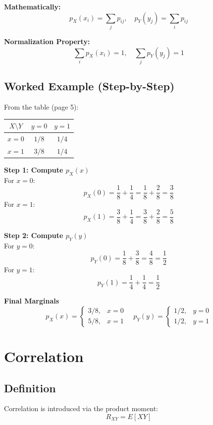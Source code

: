 \documentclass[12pt,a4paper]{article}
\begin{document}
\textbf{Mathematically:}
\[
p_X(x_i) = \sum_j p_{ij}, \quad p_Y(y_j) = \sum_i p_{ij}
\]

\textbf{Normalization Property:}
\[
\sum_i p_X(x_i)=1, \quad \sum_j p_Y(y_j)=1
\]

\subsection{Worked Example (Step-by-Step)}
From the table (page 5):

\begin{table}[h!]
\centering
\renewcommand{\arraystretch}{1.5}
\begin{tabular}{|c|c|c|}
\hline
$X \setminus Y$ & $y=0$ & $y=1$ \\
\hline
$x=0$ & $1/8$ & $1/4$ \\
\hline
$x=1$ & $3/8$ & $1/4$ \\
\hline
\end{tabular}
\end{table}

\textbf{Step 1: Compute $p_X(x)$} \\
For $x=0$:
\[
p_X(0) = \frac{1}{8} + \frac{1}{4} = \frac{1}{8} + \frac{2}{8} = \frac{3}{8}
\]
For $x=1$:
\[
p_X(1) = \frac{3}{8} + \frac{1}{4} = \frac{3}{8} + \frac{2}{8} = \frac{5}{8}
\]

\textbf{Step 2: Compute $p_Y(y)$} \\
For $y=0$:
\[
p_Y(0) = \frac{1}{8} + \frac{3}{8} = \frac{4}{8} = \frac{1}{2}
\]
For $y=1$:
\[
p_Y(1) = \frac{1}{4} + \frac{1}{4} = \frac{1}{2}
\]

\textbf{Final Marginals}
\[
p_X(x) =
\begin{cases} 
3/8, & x=0 \\ 
5/8, & x=1 
\end{cases}
\quad
p_Y(y) =
\begin{cases} 
1/2, & y=0 \\ 
1/2, & y=1 
\end{cases}
\]

\section{Correlation}

\subsection{Definition}
Correlation is introduced via the product moment:
\[
R_{XY} = E[XY]
\]
\end{document}
